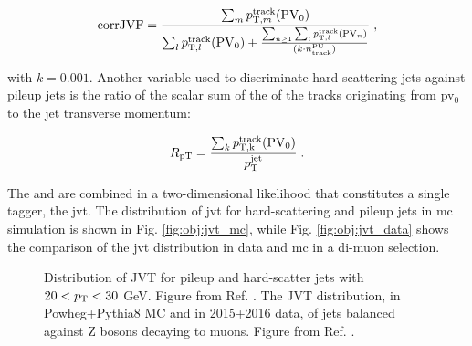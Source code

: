\begin{equation}
{\rm corrJVF} = \frac{\sum_m{p_{{\rm T}, m}^{{\rm track}}({\rm PV}_0)}}{\sum_l p_{{\rm T}, l}^{{\rm track}}({\rm PV}_0) + \frac{\sum_{n\geq1}\sum_l p_{{\rm T}, l}^{{\rm track}}({\rm PV}_n)}{ (k \cdot n_\mathrm{track}^\mathrm{PU})}} \; ,
\label{eq:corrJVF}
\end{equation}

\noindent with $k=0.001$. Another variable used to discriminate hard-scattering jets against pileup jets is the ratio of the scalar
sum of the \pt of the tracks originating from \gls{pv}$_0$ to the jet transverse momentum:


\begin{equation}
R_\mathrm{pT} = \frac{\sum_k{p_{\rm{T}, k}^{{\rm track}}({\rm PV}_0)}}{p_\mathrm{T}^\mathrm{jet}} \;.
\label{eq:obj:rpt}
\end{equation}

The \cJVF and \RpT are combined in a two-dimensional likelihood that constitutes a single tagger, the \gls{jvt}. 
The distribution of \gls{jvt} for hard-scattering and pileup jets in \gls{mc} simulation is shown in Fig. \ref{fig:obj:jvt_mc},
while Fig. \ref{fig:obj:jvt_data} shows the comparison of the \gls{jvt} distribution in data and \gls{mc} in a di-muon selection.


\begin{figure}[h]
\begin{center}
\end{center}
 \caption{ Distribution of JVT for pileup and hard-scatter jets with $20 < p_{\rm T} < 30$ GeV. Figure from Ref. \cite{ATLAS:2014cva}.  The JVT distribution, in Powheg+Pythia8 MC and in 2015+2016 data, of jets balanced against Z bosons decaying to muons. Figure from Ref. \cite{jvtpublicplots}.}
  \label{fig:obj:jvt}
\end{figure}

